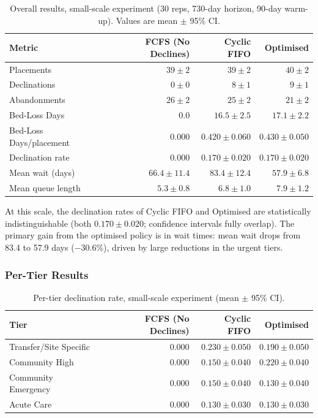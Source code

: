 \begin{table}[H]
\centering
\caption{Overall results, small-scale experiment (30 reps, 730-day horizon, 90-day warm-up).
         Values are mean $\pm$ 95\% CI.}
\label{tab:small_overall}
\begin{tabular}{lrrr}
\toprule
\textbf{Metric} & \textbf{FCFS (No Declines)} & \textbf{Cyclic FIFO} & \textbf{Optimised} \\
\midrule
Placements              & $39 \pm 2$    & $39 \pm 2$    & $40 \pm 2$ \\
Declinations            & $0 \pm 0$     & $8 \pm 1$     & $9 \pm 1$  \\
Abandonments            & $26 \pm 2$    & $25 \pm 2$    & $21 \pm 2$ \\
Bed-Loss Days           & $0.0$         & $16.5 \pm 2.5$ & $17.1 \pm 2.2$ \\
Bed-Loss Days/placement & $0.000$       & $0.420 \pm 0.060$ & $0.430 \pm 0.050$ \\
Declination rate        & $0.000$       & $0.170 \pm 0.020$ & $0.170 \pm 0.020$ \\
Mean wait (days)        & $66.4 \pm 11.4$ & $83.4 \pm 12.4$ & $57.9 \pm 6.8$ \\
Mean queue length       & $5.3 \pm 0.8$ & $6.8 \pm 1.0$ & $7.9 \pm 1.2$ \\
\bottomrule
\end{tabular}
\end{table}

At this scale, the declination rates of Cyclic FIFO and Optimised are
statistically indistinguishable (both $0.170 \pm 0.020$; confidence intervals
fully overlap). The primary gain from the optimised policy is in wait times:
mean wait drops from 83.4 to 57.9 days ($-30.6\%$), driven by large reductions
in the urgent tiers.

\subsubsection*{Per-Tier Results}

\begin{table}[H]
\centering
\caption{Per-tier declination rate, small-scale experiment (mean $\pm$ 95\% CI).}
\label{tab:small_tier_declin}
\begin{tabular}{lrrr}
\toprule
\textbf{Tier} & \textbf{FCFS (No Declines)} & \textbf{Cyclic FIFO} & \textbf{Optimised} \\
\midrule
Transfer/Site Specific & $0.000$ & $0.230 \pm 0.050$ & $0.190 \pm 0.050$ \\
Community High         & $0.000$ & $0.150 \pm 0.040$ & $0.220 \pm 0.040$ \\
Community Emergency    & $0.000$ & $0.150 \pm 0.040$ & $0.130 \pm 0.040$ \\
Acute Care             & $0.000$ & $0.130 \pm 0.030$ & $0.130 \pm 0.030$ \\
\bottomrule
\end{tabular}
\end{table}

